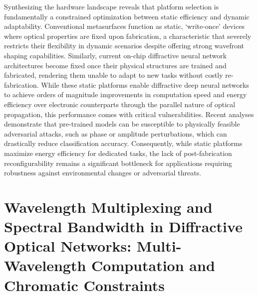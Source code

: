 \documentclass[11pt]{article}
\begin{document}
Synthesizing the hardware landscape reveals that platform selection is fundamentally a constrained optimization between static efficiency and dynamic adaptability. Conventional metasurfaces function as static, `write-once' devices where optical properties are fixed upon fabrication, a characteristic that severely restricts their flexibility in dynamic scenarios despite offering strong wavefront shaping capabilities. Similarly, current on-chip diffractive neural network architectures become fixed once their physical structures are trained and fabricated, rendering them unable to adapt to new tasks without costly re-fabrication. While these static platforms enable diffractive deep neural networks to achieve orders of magnitude improvements in computation speed and energy efficiency over electronic counterparts through the parallel nature of optical propagation, this performance comes with critical vulnerabilities. Recent analyses demonstrate that pre-trained models can be susceptible to physically feasible adversarial attacks, such as phase or amplitude perturbations, which can drastically reduce classification accuracy. Consequently, while static platforms maximize energy efficiency for dedicated tasks, the lack of post-fabrication reconfigurability remains a significant bottleneck for applications requiring robustness against environmental changes or adversarial threats. \citep{doi_10_1002_nap2_70185_56c8ab30} \citep{doi_10_1117_12_3109287_f4650a31} \citep{doi_10_1109_dac18074_2021_9586204_0c48190f}

\section{Wavelength Multiplexing and Spectral Bandwidth in Diffractive Optical Networks: Multi-Wavelength Computation and Chromatic Constraints}\label{wavelength-multiplexing-and-spectral-bandwidth-in-diffractive-optical-networks-multi-wavelength-computation-and-chromatic-constraints}
\end{document}
